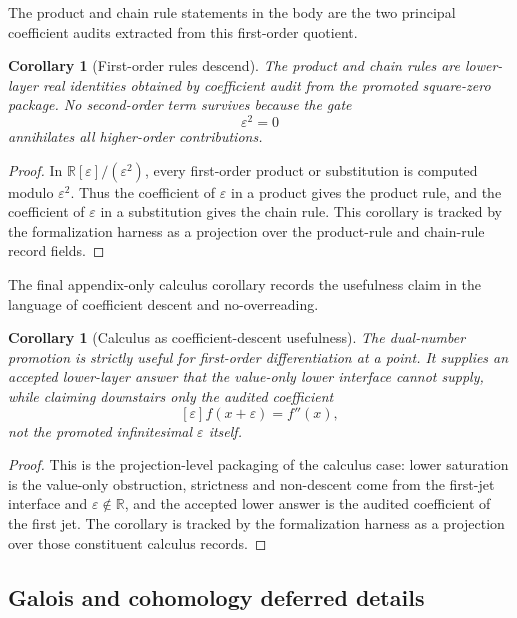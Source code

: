\documentclass[11pt]{article}
\newcommand{\R}{\mathbb R}
\newcommand{\Dual}{\R[\varepsilon]/(\varepsilon^2)}
\newtheorem{corollary}[theorem]{Corollary}
\theoremstyle{definition}
\begin{document}
The product and chain rule statements in the body are the two principal
coefficient audits extracted from this first-order quotient.

\begin{corollary}[First-order rules descend]
\label{cor:jet-rules-descend}
The product and chain rules are lower-layer real identities obtained by coefficient audit from the promoted square-zero package.  No second-order term survives because the gate
\[
\varepsilon^2=0
\]
annihilates all higher-order contributions.
\end{corollary}

\begin{proof}
In \(\Dual\), every first-order product or substitution is computed modulo
\(\varepsilon^2\).  Thus the coefficient of \(\varepsilon\) in a product gives
the product rule, and the coefficient of \(\varepsilon\) in a substitution gives
the chain rule.  This corollary is tracked by the formalization harness as a
projection over the product-rule and chain-rule record fields.
\end{proof}

The final appendix-only calculus corollary records the usefulness claim in the
language of coefficient descent and no-overreading.

\begin{corollary}[Calculus as coefficient-descent usefulness]
\label{cor:jet-coefficient-descent-usefulness}
The dual-number promotion is strictly useful for first-order differentiation at a point.  It supplies an accepted lower-layer answer that the value-only lower interface cannot supply, while claiming downstairs only the audited coefficient
\[
[\varepsilon]f(x+\varepsilon)=f''(x),
\]
not the promoted infinitesimal \(\varepsilon\) itself.
\end{corollary}

\begin{proof}
This is the projection-level packaging of the calculus case: lower saturation is
the value-only obstruction, strictness and non-descent come from the
first-jet interface and \(\varepsilon\notin\mathbb R\), and the accepted lower
answer is the audited coefficient of the first jet.  The corollary is tracked by
the formalization harness as a projection over those constituent calculus
records.
\end{proof}

\subsection{Galois and cohomology deferred details}
\label{appsubsec:methods-galois-cohomology}
\end{document}
